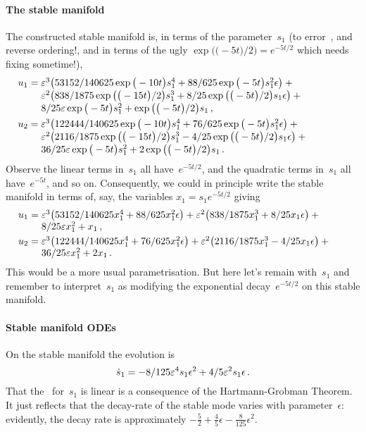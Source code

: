 \paragraph{The stable manifold} 
The constructed stable manifold is, in terms of the parameter~\(s_1\) (to error~, and reverse ordering!, and in terms of the ugly \(\exp \big(\big(-5 t\big)/2
\big)=e^{-5t/2}\) which needs fixing sometime!), 
\begin{align*}&
u_{1}=\ParMath{\eps^{3} \big(53152/140625 \exp \big(-10 t\big) s_{1}^{4}+88/625 
\exp \big(-5 t\big) s_{1}^{2} \epsilon \big)+\eps^{2} \big(838/1875 \exp
 \big(\big(-15 t\big)/2\big) s_{1}^{3}+8/25 \exp \big(\big(-5 t\big)/2
\big) s_{1} \epsilon \big)+8/25 \eps \exp \big(-5 t\big) s_{1}^{2}+\exp 
\big(\big(-5 t\big)/2\big) s_{1}
\,,}
\\&
u_{2}=\ParMath{\eps^{3} \big(122444/140625 \exp \big(-10 t\big) s_{1}^{4}+76/625 
\exp \big(-5 t\big) s_{1}^{2} \epsilon \big)+\eps^{2} \big(2116/1875 
\exp \big(\big(-15 t\big)/2\big) s_{1}^{3}-4/25 \exp \big(\big(-5 t\big)
/2\big) s_{1} \epsilon \big)+36/25 \eps \exp \big(-5 t\big) s_{1}^{2}+2 
\exp \big(\big(-5 t\big)/2\big) s_{1}
\,.}
\end{align*}
Observe the linear terms in~\(s_1\) all have~\(e^{-5t/2}\), and the quadratic terms in~\(s_1\) all have~\(e^{-5t}\), and so on.
Consequently, we could in principle write the stable manifold in terms of, say, the variables \(x_1=s_1e^{-5t/2}\) giving  
\begin{align*}&
u_{1}=\ParMath{\eps^{3} \big(53152/140625 x_{1}^{4}+88/625 
x_{1}^{2} \epsilon \big)+\eps^{2} \big(838/1875 x_{1}^{3}+8/25 x_{1} \epsilon \big)+8/25 \eps x_{1}^{2}+x_{1}
\,,}
\\&
u_{2}=\ParMath{\eps^{3} \big(122444/140625 x_{1}^{4}+76/625 
x_{1}^{2} \epsilon \big)+\eps^{2} \big(2116/1875 
x_{1}^{3}-4/25 x_{1} \epsilon \big)+36/25 \eps x_{1}^{2}+2 
x_{1}
\,.}
\end{align*}
This would be a more usual parametrisation.  But here let's remain with~\(s_1\) and remember to interpret~\(s_1\) as modifying the exponential decay~\(e^{-5t/2}\) on this stable manifold.


\paragraph{Stable manifold ODEs} 
On the stable manifold the evolution is
\begin{equation*}
\dot s_{1}=-8/125 \varepsilon^{4} s_{1} \epsilon ^{2}+4/5 \varepsilon^{2} s_{1} 
\epsilon\,.
\end{equation*}
That the \ode\ for~\(s_1\) is linear is a consequence of the Hartmann-Grobman Theorem.  It just reflects that the decay-rate of the stable mode varies with parameter~\(\epsilon\): evidently, the decay rate is approximately \(-\tfrac52+\tfrac45\epsilon-\tfrac8{125}\epsilon ^{2}\). 


